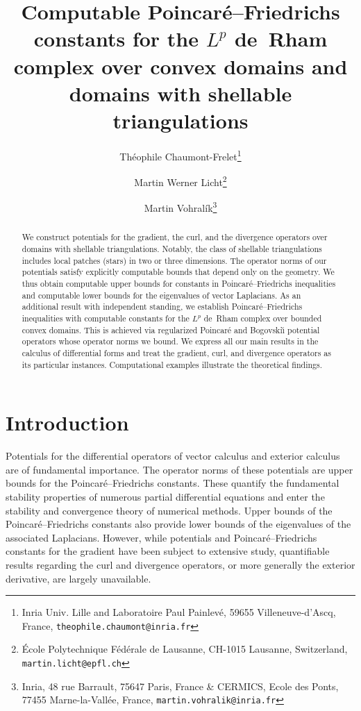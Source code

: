 \documentclass[10pt,a4paper]{article}
\title{Computable Poincar\'e--Friedrichs constants for the $L^{p}$ de~Rham complex over convex domains and domains with shellable triangulations}
\author{
    Th\'eophile Chaumont-Frelet\thanks{Inria Univ. Lille and Laboratoire Paul Painlev\'e, 59655 Villeneuve-d'Ascq, France, \texttt{theophile.chaumont@inria.fr}} \and
    Martin Werner Licht\thanks{\'Ecole Polytechnique F\'ed\'erale de Lausanne, CH-1015 Lausanne, Switzerland, \texttt{martin.licht@epfl.ch}} \and
    Martin Vohral\'ik\thanks{Inria, 48 rue Barrault, 75647 Paris, France \& CERMICS, Ecole des Ponts, 77455 Marne-la-Vall\'ee, France, \texttt{martin.vohralik@inria.fr}}
}
\date{}
\begin{document}
\maketitle

\begin{abstract}
    We construct potentials for the gradient, the curl, and the divergence operators over domains with shellable triangulations. 
    Notably, the class of shellable triangulations includes local patches (stars) in two or three dimensions. 
    The operator norms of our potentials satisfy explicitly computable bounds that depend only on the geometry. 
    We thus obtain computable upper bounds for constants in Poincar\'e--Friedrichs inequalities and computable lower bounds for the eigenvalues of vector Laplacians. 
    As an additional result with independent standing, we establish Poincar\'e--Friedrichs inequalities with computable constants for the $L^{p}$ de~Rham complex over bounded convex domains. 
    This is achieved via regularized Poincar\'e and Bogovski\u{\i} potential operators whose operator norms we bound.
    We express all our main results in the calculus of differential forms and treat the gradient, curl, and divergence operators as its particular instances. 
    Computational examples illustrate the theoretical findings.
\end{abstract}


 



\section{Introduction}\label{section:intro}

Potentials for the differential operators of vector calculus and exterior calculus are of fundamental importance. 
The operator norms of these potentials are upper bounds for the Poincar\'e--Friedrichs constants.
These quantify the fundamental stability properties of {numerous} partial differential equations %
and enter the stability and convergence theory of numerical methods. 
Upper bounds of the Poincar\'e--Friedrichs constants also provide lower bounds of the eigenvalues of the associated Laplacians.
However, while potentials and Poincar\'e--Friedrichs constants for the gradient have been subject to extensive study,
quantifiable results regarding the curl and divergence operators, or more generally the exterior derivative, are largely unavailable.
\end{document}
